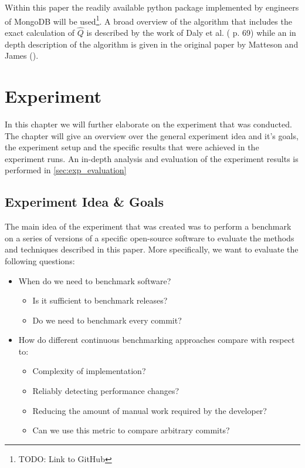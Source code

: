\documentclass[	runningheads,
				a4paper]{llncs}
\begin{document}
	Within this paper the readily available python package implemented by engineers of MongoDB will be used\footnote{TODO: Link to GitHub}. A broad overview of the algorithm that includes the exact calculation of $\hat{Q}$ is described by the work of Daly et al. (\cite{daly2020} p. 69) while an in depth description of the algorithm is given in the original paper by Matteson and James (\cite{Matteson2014}).

\section{Experiment}
In this chapter we will further elaborate on the experiment that was conducted. The chapter will give an overview over the general experiment idea and it's goals, the experiment setup and the specific results that were achieved in the experiment runs. An in-depth analysis and evaluation of the experiment results is performed in \autoref{sec:exp_evaluation}

	\subsection{Experiment Idea \& Goals}
	\label{ssec:exp_goals}

	The main idea of the experiment that was created was to perform a benchmark on a series of versions of a specific open-source software to evaluate the methods and techniques described in this paper. More specifically, we want to evaluate the following questions:
	\begin{itemize}
		\item When do we need to benchmark software?
			\begin{itemize}
				\item Is it sufficient to benchmark releases?
				\item Do we need to benchmark every commit?
			\end{itemize}
		\item How do different continuous benchmarking approaches compare with respect to:
			\begin{itemize}
				\item Complexity of implementation?
				\item Reliably detecting performance changes?
				\item Reducing the amount of manual work required by the developer?
				\item Can we use this metric to compare arbitrary commits?
			\end{itemize}
	\end{itemize}
\end{document}
